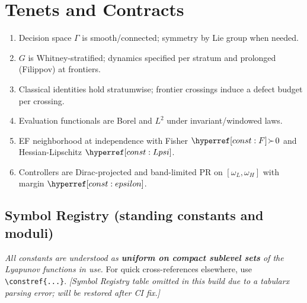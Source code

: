 

\section*{Tenets and Contracts}

\begin{standbox}
\begin{enumerate}[leftmargin=*,label=(H\arabic*)]
  \item Decision space $\Gamma$ is smooth/connected; symmetry by Lie group when needed.
  \item $G$ is Whitney-stratified; dynamics specified per stratum and prolonged (Filippov) at frontiers.
  \item Classical identities hold stratumwise; frontier crossings induce a defect budget per crossing.
  \item Evaluation functionals are Borel and $L^2$ under invariant/windowed laws.
  \item EF neighborhood at independence with Fisher $\constref{F}\!\succ\!0$ and Hessian-Lipschitz $\constref{Lpsi}$.
  \item Controllers are Dirac-projected and band-limited PR on $[\omega_L,\omega_H]$ with margin $\constref{epsilon}$.
\end{enumerate}
\end{standbox}

\subsection*{Symbol Registry (standing constants and moduli)}\label{sec:symbol-registry}
\noindent\emph{All constants are understood as \textbf{uniform on compact sublevel sets} of the Lyapunov functions in use.}
For quick cross-references elsewhere, use \verb+\constref{...}+.
\noindent\emph{[Symbol Registry table omitted in this build due to a tabularx parsing error; will be restored after CI fix.]}

